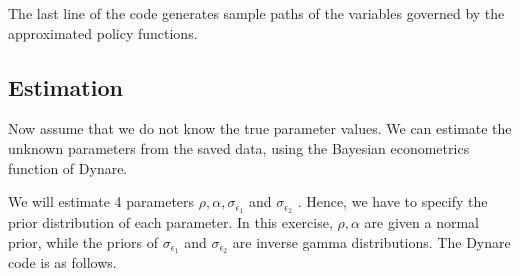 \documentclass[a4paper,12pt]{scrartcl} %
\begin{document}
The last line of the code generates sample paths of the variables governed by the approximated policy functions.

\subsection{Estimation}

Now assume that we do not know the true parameter values. We can estimate the unknown parameters from the saved data, using the Bayesian econometrics function of Dynare.

We will estimate 4 parameters $\rho, \alpha, \sigma_{\epsilon_1}$ and $\sigma_{\epsilon_2}$ . Hence, we have to specify the prior distribution of each parameter. In this exercise, $\rho, \alpha$ are given a normal prior, while the priors of $ \sigma_{\epsilon_1}$ and $\sigma_{\epsilon_2}$ are inverse gamma distributions. The Dynare code is as follows.\\
\\
\end{document}
